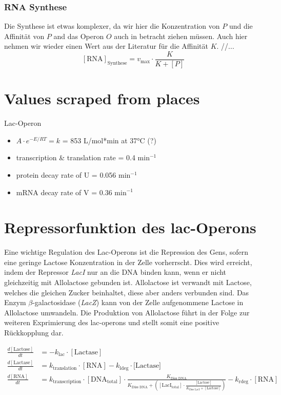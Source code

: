 \documentclass{article}
\begin{document}
\subsubsection{RNA Synthese}
Die Synthese ist etwas komplexer, da wir hier die Konzentration von $P$ und die Affinität von $P$ and das Operon $O$ auch in betracht ziehen müssen. Auch hier nehmen wir wieder einen Wert aus der Literatur\cite{lacoperon} für die Affinität $K$. //...
\begin{equation} \label{eq:3}
    [\text{RNA}]_{\text{Synthese}}=v_{\text{max}} \cdot \frac{K}{K+[P]}
\end{equation}

\newpage
\section{Values scraped from places}
Lac-Operon\cite{lacoperon}
\begin{itemize}
    \item $A \cdot e^{-E/RT} = k$ = 853 L/mol*min at 37°C (?)
    \item transcription \& translation rate = 0.4 min$^{-1}$
    \item protein decay rate of U = 0.056 min$^{-1}$
    \item mRNA decay rate of V = 0.36 min$^{-1}$
\end{itemize}

\section*{Repressorfunktion des lac-Operons}

Eine wichtige Regulation des Lac-Operons ist die Repression des Gens, sofern eine geringe Lactose Konzentration in der Zelle vorherrscht. Dies wird erreicht, indem der Repressor \emph{LacI} nur an die DNA binden kann, wenn er nicht gleichzeitig mit Allolactose gebunden ist. Allolactose ist verwandt mit Lactose, welches die gleichen Zucker beinhaltet, diese aber anders verbunden sind. Das Enzym $\beta$-galactosidase (\emph{LacZ}) kann von der Zelle aufgenommene Lactose in Allolactose umwandeln. Die Produktion von Allolactose führt in der Folge zur weiteren Exprimierung des lac-operons und stellt somit eine positive Rückkopplung dar.
\par



\begin{align*}
    \frac{d[\text{Lactose}]}{dt}&=-k_\text{lac}\cdot [\text{Lactase}] \\
    \frac{d[\text{Lactase}]}{dt}&=k_\text{translation}\cdot[\text{RNA}]-k_\text{ldeg}\cdot [\text{Lactase]}\\
    \frac{d[\text{RNA}]}{dt}&=k_\text{transcription}\cdot[\text{DNA}_\text{total}]\cdot\frac{K_\text{Diss DNA}}{K_\text{Diss DNA}+([\text{LacI}_\text{total}]\cdot\frac{[\text{Lactose}]}{K_\text{Diss LacI}+[\text{Lactose}]})}-k_\text{rdeg}\cdot[\text{RNA}]
\end{align*}

\printbibliography[title=References]
\end{document}
